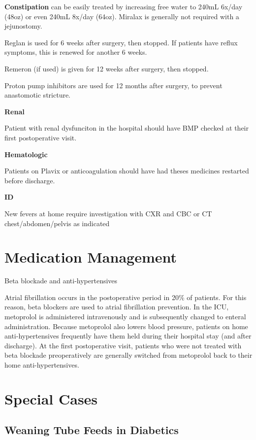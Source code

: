 \documentclass[
  letterpaper,
]{scrbook}
\begin{document}
\textbf{Constipation} can be easily treated by increasing free water to
240mL 6x/day (48oz) or even 240mL 8x/day (64oz). Miralax is generally
not required with a jejunostomy.

Reglan is used for 6 weeks after surgery, then stopped. If patients have
reflux symptoms, this is renewed for another 6 weeks.

Remeron (if used) is given for 12 weeks after surgery, then stopped.

Proton pump inhibitors are used for 12 months after surgery, to prevent
anastomotic stricture.

\textbf{Renal}

Patient with renal dysfunciton in the hospital should have BMP checked
at their first postoperative visit.

\textbf{Hematologic}

Patients on Plavix or anticoagulation should have had theses medicines
restarted before discharge.

\textbf{ID}

New fevers at home require investigation with CXR and CBC or CT
chest/abdomen/pelvis as indicated

\section{Medication Management}\label{medication-management}

Beta blockade and anti-hypertensives

Atrial fibrillation occurs in the postoperative period in 20\% of
patients. For this reason, beta blockers are used to atrial fibrillation
prevention. In the ICU, metoprolol is administered intravenously and is
subsequently changed to enteral administration. Because metoprolol also
lowers blood pressure, patients on home anti-hypertensives frequently
have them held during their hospital stay (and after discharge). At the
first postoperative visit, patients who were not treated with beta
blockade preoperatively are generally switched from metoprolol back to
their home anti-hypertensives.

\section{Special Cases}\label{special-cases}

\subsection{Weaning Tube Feeds in
Diabetics}\label{outpt_tubefeeds_diabetes}
\end{document}
